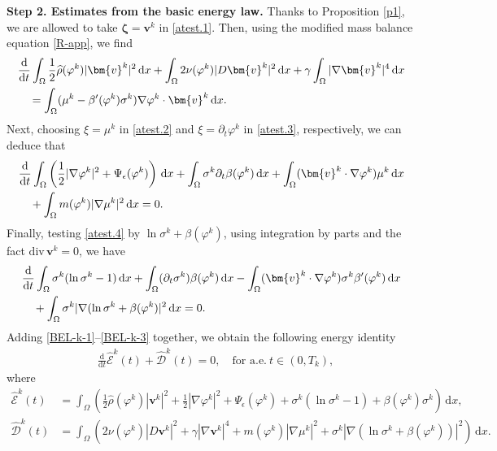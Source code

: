 \documentclass[11pt,reqno]{amsart}
\def\d{{\rm d}}
\def\vv{\bm{v}}
\begin{document}
\textbf{Step 2. Estimates from the basic energy law.}
Thanks to Proposition \ref{p1}, we are allowed to take $\bm{\zeta}=\boldsymbol{v}^k$ in \eqref{atest.1}. Then, using the modified mass balance equation \eqref{R-app}, we find
%
\begin{align}
&\frac{\d}{\d t} \int_\Omega \frac12\widehat{\rho}(\varphi^k)|\vv^k|^2\,\d x
+\int_\Omega  2\nu(\varphi^{k}) |D\bm{v}^{k}|^2\,\d x
+\gamma \int_\Omega |\nabla\vv^k|^4\,\d x
\notag \\
&\quad =\int_\Omega (\mu^{k} -\beta'(\varphi^k) \sigma^{k})\nabla \varphi^{k}\cdot \vv^k\, \d x.
\label{BEL-k-1}
\end{align}
%
Next, choosing $\xi= \mu^k$ in \eqref{atest.2} and $\xi= \partial_t\varphi^k$ in \eqref{atest.3}, respectively, we can deduce that
\begin{align}
& \frac{\d}{\d t} \int_\Omega \left(\frac{1}{2}|\nabla \varphi^k|^2+ \Psi_\epsilon(\varphi^k)\right)\,\d x + \int_\Omega \sigma^k\partial_t \beta(\varphi^k)  \,\d x
+ \int_\Omega (\vv^k\cdot\nabla \varphi^k)\mu^k\, \d x
\notag\\
&\quad +\int_\Omega m(\varphi^k)|\nabla \mu^k|^2\,\d x=0.
\label{BEL-k-2}
\end{align}
%
Finally, testing \eqref{atest.4} by $\ln \sigma^k+\beta(\varphi^k)$, using integration by parts and the fact $\mathrm{div}\, \vv^k=0$, we have
\begin{align}
& \frac{\d}{\d t} \int_\Omega  \sigma^k (\ln \sigma^k -1)\,\d x
+ \int_\Omega (\partial_t \sigma^k) \beta(\varphi^k)\,\d x
- \int_\Omega (\vv^k\cdot \nabla \varphi^k) \sigma^k \beta'(\varphi^k) \,\d x
\notag\\
& \quad +
\int_\Omega \sigma^k|\nabla (\ln \sigma^k +\beta(\varphi^k)|^2\,\d x=0.
\label{BEL-k-3}
\end{align}
%
Adding \eqref{BEL-k-1}--\eqref{BEL-k-3} together, we obtain the following energy identity
%
\begin{align}
& \frac{\mathrm{d}}{\mathrm{d}t}\widehat{\mathcal{E}}^k(t)
+ \widehat{\mathcal{D}}^k(t)
 =0,\quad \text{for a.e.}\ t\in(0,T_k),
\label{menergy}
\end{align}
%
where
\begin{align*}
\widehat{\mathcal{E}}^k(t)
&=\int_{\Omega}\left( \frac{1}{2}\widehat{\rho}(\varphi^k)|\boldsymbol{v}^k|^{2}
+\frac{1}{2}|\nabla \varphi^k|^{2}
+ \Psi_\epsilon(\varphi^k) +\sigma^k(\ln \sigma^k-1)
+ \beta(\varphi^k) \sigma^k\right) \, \mathrm{d} x,
\\
\widehat{\mathcal{D}}^k(t)
& =\int_{\Omega} \left(2 \nu(\varphi^k)|D \boldsymbol{v}^k|^{2}
+\gamma|\nabla \vv^k|^4
+m(\varphi^k)|\nabla \mu^k|^{2}
+ \sigma^k|\nabla(\ln \sigma^k+ \beta(\varphi^k))|^{2}\right)\, \mathrm{d} x.
\end{align*}
%
\end{document}
